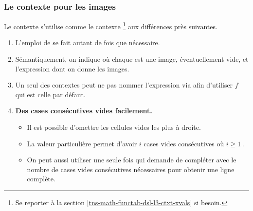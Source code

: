 \documentclass{tutodoc}
\begin{document}

\subsubsection{Le contexte  pour les images}
\label{tns-math-functab-dsl-l3-ctxt-imgs}

Le contexte  s'utilise comme le contexte 
\footnote{
    Se reporter à la section \ref{tns-math-functab-dsl-l3-ctxt-xvals} si besoin.
}
aux différences près suivantes.
%
\begin{enumerate}
    \item L'emploi de  se fait autant de fois que nécessaire.


    \item Sémantiquement, on indique  où chaque  est une image, éventuellement vide, et  l'expression dont on donne les images.


    \item Un seul des contextes peut ne pas nommer l'expression via  afin d'utiliser $f$ qui est celle par défaut.


    \item \textbf{Des cases consécutives vides facilement.}
    \begin{itemize}
    	\item Il est possible d'omettre les cellules vides les plus à droite.

    	\item La valeur particulière  permet d'avoir $i$ cases vides consécutives où $i \geq 1$\,.

    	\item On peut aussi utiliser une seule fois  qui demande de compléter avec le nombre de cases vides consécutives nécessaires pour obtenir une ligne complète.
    \end{itemize}
\end{enumerate}
\end{document}
